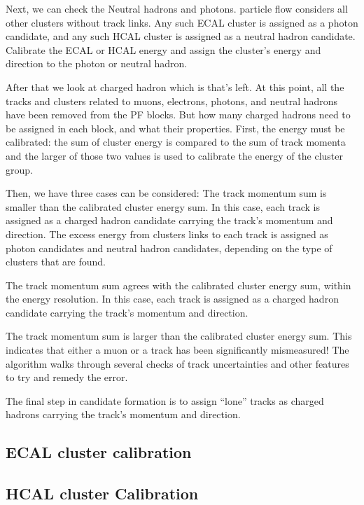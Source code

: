 Next, we can check the Neutral hadrons and photons. particle flow considers all other clusters without track links. Any such ECAL cluster is assigned as a photon candidate, and any such HCAL cluster is assigned as a neutral hadron candidate. Calibrate the ECAL or HCAL energy and assign the cluster’s energy and direction to the photon or neutral hadron. 

After that we look at charged hadron which is that’s left. At this point, all the tracks and clusters related to muons, electrons, photons, and neutral hadrons have been removed from the PF blocks.  But how many charged hadrons need to be assigned in each block, and what their properties. First, the energy must be calibrated: the sum of cluster energy is compared to the sum of track momenta and the larger of those two values is used to calibrate the energy of the cluster group.   

Then, we have three cases can be considered: The track momentum sum is smaller than the calibrated cluster energy sum. In this case, each track is assigned as a charged hadron candidate carrying the track’s momentum and direction. The excess energy from clusters links to each track is assigned as photon candidates and neutral hadron candidates, depending on the type of clusters that are found.  

The track momentum sum agrees with the calibrated cluster energy sum, within the energy resolution.  In this case, each track is assigned as a charged hadron candidate carrying the track’s momentum and direction.  

The track momentum sum is larger than the calibrated cluster energy sum. This indicates that either a muon or a track has been significantly mismeasured! The algorithm walks through several checks of track uncertainties and other features to try and remedy the error. 

The final step in candidate formation is to assign “lone” tracks as charged hadrons carrying the track’s momentum and direction. 

\subsection{ECAL cluster calibration}

\subsection{HCAL cluster Calibration}





